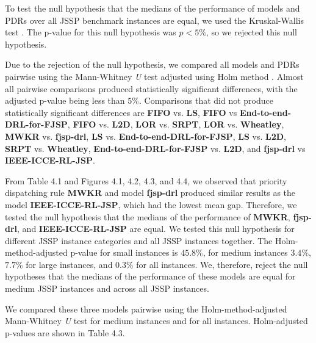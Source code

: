 To test the null hypothesis that the medians of the performance of models and PDRs over all JSSP benchmark instances are equal, we used the Kruskal-Wallis test \cite{doi:10.1080/01621459.1952.10483441}. The p-value for this null hypothesis was $p < 5\%$, so we rejected this null hypothesis.
\par
Due to the rejection of the null hypothesis, we compared all models and PDRs pairwise using the Mann-Whitney \textit{U} test \cite{mannwhitneyutest} adjusted using Holm method \cite{holmmethod}. Almost all pairwise comparisons produced statistically significant differences, with the adjusted p-value being less than $5\%$. Comparisons that did not produce statistically significant differences are \textbf{FIFO} vs. \textbf{LS}, \textbf{FIFO} vs \textbf{End-to-end-DRL-for-FJSP}, \textbf{FIFO} vs. \textbf{L2D}, \textbf{LOR} vs. \textbf{SRPT}, \textbf{LOR} vs. \textbf{Wheatley}, \textbf{MWKR} vs. \textbf{fjsp-drl}, \textbf{LS} vs. \textbf{End-to-end-DRL-for-FJSP}, \textbf{LS} vs. \textbf{L2D}, \textbf{SRPT} vs. \textbf{Wheatley}, \textbf{End-to-end-DRL-for-FJSP} vs. \textbf{L2D}, and \textbf{fjsp-drl} vs \textbf{IEEE-ICCE-RL-JSP}.
\par
From Table 4.1 and Figures 4.1, 4.2, 4.3, and 4.4, we observed that priority dispatching rule \textbf{MWKR} and model \textbf{fjsp-drl} produced similar results as the model \textbf{IEEE-ICCE-RL-JSP}, which had the lowest mean gap. Therefore, we tested the null hypothesis that the medians of the performance of \textbf{MWKR}, \textbf{fjsp-drl}, and \textbf{IEEE-ICCE-RL-JSP} are equal. We tested this null hypothesis for different JSSP instance categories and all JSSP instances together. The Holm-method-adjusted p-value for small instances is $45.8\%$, for medium instances $3.4\%$, $7.7\%$ for large instances, and 0.3$\%$ for all instances. We, therefore, reject the null hypotheses that the medians of the performance of these models are equal for medium JSSP instances and across all JSSP instances.
\par
We compared these three models pairwise using the Holm-method-adjusted Mann-Whitney \textit{U} test for medium instances and for all instances. Holm-adjusted p-values are shown in Table 4.3.

